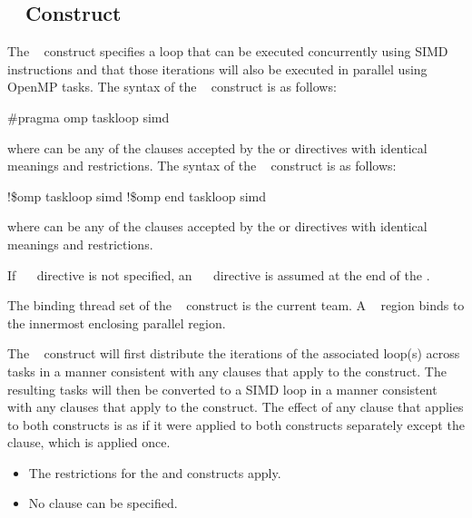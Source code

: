 \subsection{~ Construct}
\label{subsec:taskloop simd Construct}
\summary
The ~ construct specifies a loop that can be executed concurrently using SIMD instructions and that those iterations will also be executed in parallel using OpenMP tasks.
\syntax
\ccppspecificstart
The syntax of the ~ construct is as follows:
\begin{boxedcode}
\#pragma omp taskloop simd 
\end{boxedcode}
where  can be any of the clauses accepted by the  or  directives with identical meanings and restrictions.
\ccppspecificend
\fortranspecificstart
The syntax of the ~ construct is as follows:
\begin{boxedcode}
!\$omp taskloop simd 
\plc{[}!\$omp end taskloop simd\plc{]}
\end{boxedcode}
where  can be any of the clauses accepted by the  or  directives with identical meanings and restrictions.

If ~~ directive is not specified, an ~~ directive is assumed at the end of the .
\fortranspecificend

\binding
The binding thread set of the ~ construct is the current team. A ~ region binds to the innermost enclosing parallel region.

\descr
The ~ construct will first distribute the iterations of the associated loop(s) across tasks in a manner consistent with any clauses that apply to the  construct. The resulting tasks will then be converted to a SIMD loop in a manner consistent with any clauses that apply to the  construct. The effect of any clause that applies to both constructs is as if it were applied to both constructs separately except the  clause, which is applied once.

\restrictions
\begin{itemize}
\item The restrictions for the  and  constructs apply.
\item No  clause can be specified. 
\end{itemize}

